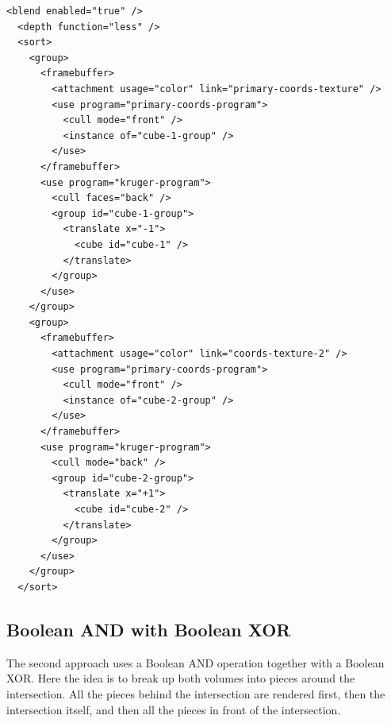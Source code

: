 \documentclass{article}
\begin{document}
\begin{Verbatim}[fontsize=\small]
  <blend enabled="true" />
  <depth function="less" />
  <sort>
    <group>
      <framebuffer>
        <attachment usage="color" link="primary-coords-texture" />
        <use program="primary-coords-program">
          <cull mode="front" />
          <instance of="cube-1-group" />
        </use>
      </framebuffer>
      <use program="kruger-program">
        <cull faces="back" />
        <group id="cube-1-group">
          <translate x="-1">
            <cube id="cube-1" />
          </translate>
        </group>
      </use>
    </group>
    <group>
      <framebuffer>
        <attachment usage="color" link="coords-texture-2" />
        <use program="primary-coords-program">
          <cull mode="front" />
          <instance of="cube-2-group" />
        </use>
      </framebuffer>
      <use program="kruger-program">
        <cull mode="back" />
        <group id="cube-2-group">
          <translate x="+1">
            <cube id="cube-2" />
          </translate>
        </group>
      </use>
    </group>
  </sort>
\end{Verbatim}

\subsection{Boolean AND with Boolean XOR}

The second approach uses a Boolean AND operation together with a Boolean XOR.
Here the idea is to break up both volumes into pieces around the intersection.
All the pieces behind the intersection are rendered first, then the intersection
itself, and then all the pieces in front of the intersection.
\end{document}
